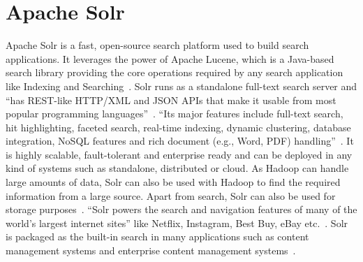 \section{Apache Solr}

Apache Solr is a fast, open-source search platform used to build search
applications. It leverages the power of Apache Lucene, which is a Java-based
search library providing the core operations required by any search application
like Indexing and Searching~\cite{hid-sp18-516-tutorialspoint-solr}. Solr runs
as a standalone full-text search server and ``has REST-like HTTP/XML and JSON
APIs that make it usable from most popular programming
languages''~\cite{hid-sp18-516-wiki-solr}. ``Its major features include
full-text search, hit highlighting, faceted search, real-time indexing, dynamic
clustering, database integration, NoSQL features and rich document (e.g., Word,
PDF) handling''~\cite{hid-sp18-516-wiki-solr}. It is highly scalable,
fault-tolerant and enterprise ready and can be deployed in any kind of systems
such as standalone, distributed or cloud. As Hadoop can handle large amounts of
data, Solr can also be used with Hadoop to find the required information from a
large source. Apart from search, Solr can also be used for storage
purposes~\cite{hid-sp18-516-tutorialspoint-solr}. ``Solr powers the search and
navigation features of many of the world's largest internet sites'' like
Netflix, Instagram, Best Buy, eBay etc.~\cite{hid-sp18-516-apacheorg-solr}. Solr
is packaged as the built-in search in many applications such as content
management systems and enterprise content management 
systems~\cite{hid-sp18-516-wiki-solr}.
